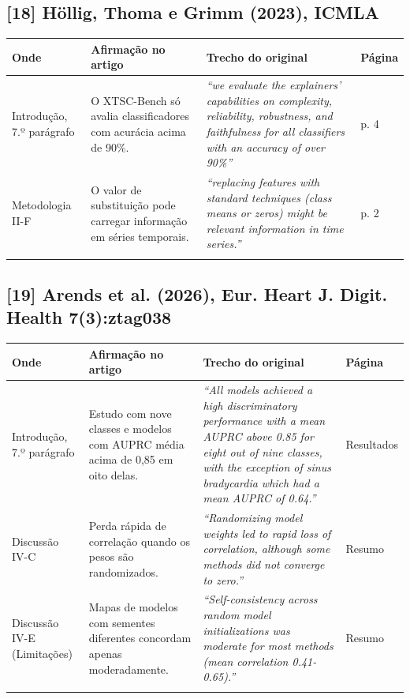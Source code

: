 \documentclass[11pt,a4paper]{article}
\begin{document}
\subsection*{[18] Höllig, Thoma e Grimm (2023), ICMLA}
\begin{longtable}{>{\raggedright\arraybackslash}p{2.6cm}>{\raggedright\arraybackslash}p{4.6cm}>{\raggedright\arraybackslash}p{7.6cm}>{\raggedright\arraybackslash}p{1.4cm}}
\toprule
\textbf{Onde} & \textbf{Afirmação no artigo} & \textbf{Trecho do original} & \textbf{Página} \\
\midrule
Introdução, 7.º parágrafo & O XTSC-Bench só avalia classificadores com acurácia acima de 90\%. & \textit{``we evaluate the explainers' capabilities on complexity, reliability, robustness, and faithfulness for all classifiers with an accuracy of over 90\%''} & p. 4 \\
\addlinespace
Metodologia II-F & O valor de substituição pode carregar informação em séries temporais. & \textit{``replacing features with standard techniques (class means or zeros) might be relevant information in time series.''} & p. 2 \\
\addlinespace
\bottomrule
\end{longtable}
\subsection*{[19] Arends et al. (2026), Eur. Heart J. Digit. Health 7(3):ztag038}
\begin{longtable}{>{\raggedright\arraybackslash}p{2.6cm}>{\raggedright\arraybackslash}p{4.6cm}>{\raggedright\arraybackslash}p{7.6cm}>{\raggedright\arraybackslash}p{1.4cm}}
\toprule
\textbf{Onde} & \textbf{Afirmação no artigo} & \textbf{Trecho do original} & \textbf{Página} \\
\midrule
Introdução, 7.º parágrafo & Estudo com nove classes e modelos com AUPRC média acima de 0,85 em oito delas. & \textit{``All models achieved a high discriminatory performance with a mean AUPRC above 0.85 for eight out of nine classes, with the exception of sinus bradycardia which had a mean AUPRC of 0.64.''} & Resultados \\
\addlinespace
Discussão IV-C & Perda rápida de correlação quando os pesos são randomizados. & \textit{``Randomizing model weights led to rapid loss of correlation, although some methods did not converge to zero.''} & Resumo \\
\addlinespace
Discussão IV-E (Limitações) & Mapas de modelos com sementes diferentes concordam apenas moderadamente. & \textit{``Self-consistency across random model initializations was moderate for most methods (mean correlation 0.41-0.65).''} & Resumo \\
\addlinespace
\bottomrule
\end{longtable}
\end{document}
